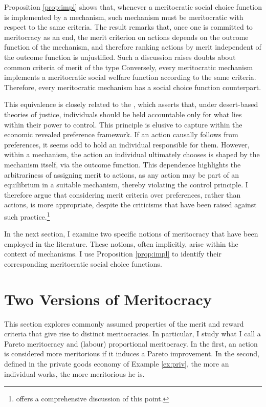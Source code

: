 Proposition \ref{prop:impl} shows that, whenever a meritocratic social choice function is implemented by a mechanism, such mechanism must be meritocratic with respect to the same criteria. The result remarks that, once one is committed to meritocracy as an end, the merit criterion on actions depends on the outcome function of the mechanism, and therefore ranking actions by merit independent of the outcome function is unjustified. Such a discussion raises doubts about common criteria of merit of the type  Conversely, every meritocratic mechanism implements a meritocratic social welfare function according to the same criteria. Therefore, every meritocratic mechanism has a social choice function counterpart.

This equivalence is closely related to the  \citep{arnesonDesertEquality2007,fleurbaeyFairnessResponsibilityWelfare2008}, which asserts that, under desert-based theories of justice, individuals should be held accountable only for what lies within their power to control. This principle is elusive to capture within the economic revealed preference framework. If an action causally follows from preferences, it seems odd to hold an individual responsible for them. However, within a mechanism, the action an individual ultimately chooses is shaped by the mechanism itself, via the outcome function. This dependence highlights the arbitrariness of assigning merit to actions, as any action may be part of an equilibrium in a suitable mechanism, thereby violating the control principle. I therefore argue that considering merit criteria over preferences, rather than actions, is more appropriate, despite the criticisms that have been raised against such practice.\footnote{\citet[ch. 10]{fleurbaeyFairnessResponsibilityWelfare2008} offers a comprehensive discussion of this point.}

In the next section, I examine two specific notions of meritocracy that have been employed in the literature. These notions, often implicitly, arise within the context of mechanisms. I use Proposition \ref{prop:impl} to identify their corresponding meritocratic social choice functions.

\section{Two Versions of Meritocracy}\label{sec:priv}

This section explores commonly assumed properties of the merit and reward criteria that give rise to distinct meritocracies. In particular, I study what I call a Pareto meritocracy and (labour) proportional meritocracy. In the first, an action is considered more meritorious if it induces a Pareto improvement. In the second, defined in the private goods economy of Example \ref{ex:priv}, the more an individual works, the more meritorious he is.

